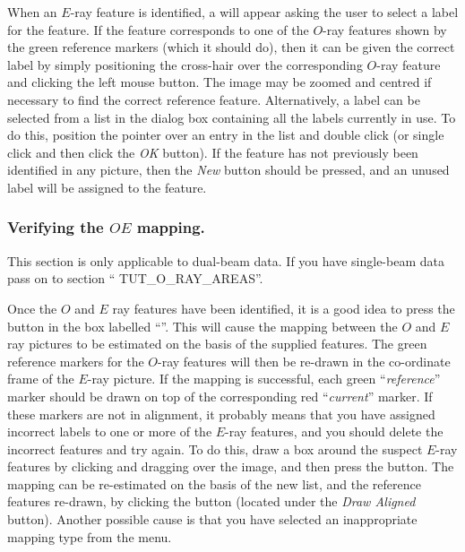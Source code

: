 When an $E$-ray feature is identified, a  will appear asking the user to select a label for
the feature. If the feature corresponds to one of the $O$-ray features
shown by the green reference markers (which it should do), then it can be
given the correct label by simply positioning the cross-hair over the
corresponding $O$-ray feature and clicking the left mouse button. The
image may be zoomed and centred if necessary to find the correct
reference feature. Alternatively, a label can be selected from a list in
the dialog box containing all the labels currently in use. To do this,
position the pointer over an entry in the list and double click (or
single click and then click the {\em OK} button). If the feature has not
previously been identified in any picture, then the {\em New} button
should be pressed, and an unused label will be assigned to the feature.

\subsubsection {Verifying the $OE$ mapping.}
This section is only applicable to dual-beam data. If you have
single-beam data pass on to section ``
{TUT_O_RAY_AREAS}''.

Once the $O$ and $E$ ray features have been identified, it is a good idea
to press the  button in
the box labelled ``''. This
will cause the mapping between the $O$ and $E$ ray pictures to be
estimated on the basis of the supplied features. The green reference
markers for the $O$-ray features will then be re-drawn in the co-ordinate
frame of the $E$-ray picture. If the mapping is successful, each green
``{\em reference}'' marker should be drawn on top of the corresponding
red ``{\em current}'' marker. If these markers are not in alignment, it
probably means that you have assigned incorrect labels to one or more of
the $E$-ray features, and you should delete the incorrect features and
try again. To do this, draw a box around the suspect $E$-ray features by
clicking and dragging over the image, and then press the  button. The mapping can be re-estimated on the
basis of the new list, and the reference features re-drawn, by clicking
the  button (located under the {\em
Draw Aligned} button). Another possible cause is that you have selected
an inappropriate mapping type from the  menu.


